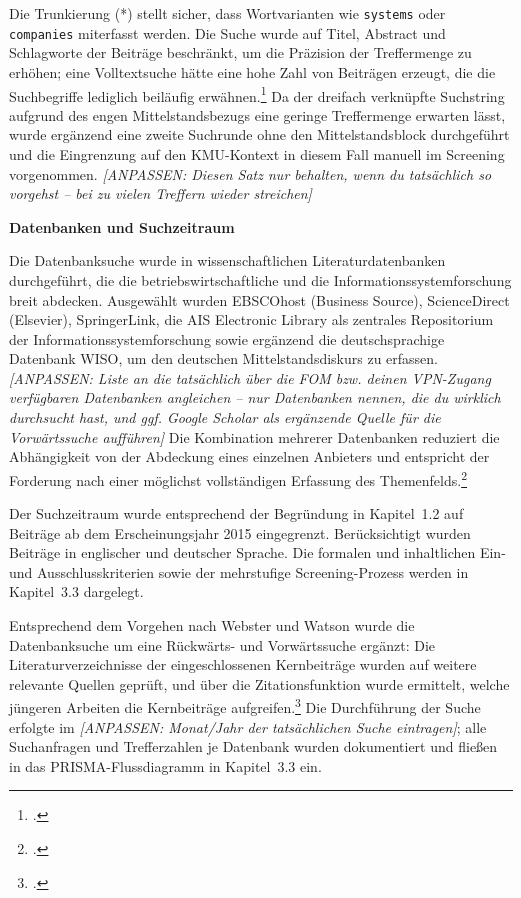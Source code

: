 Die Trunkierung (*) stellt sicher, dass Wortvarianten wie \texttt{systems} oder \texttt{companies} miterfasst werden. Die Suche wurde auf Titel, Abstract und Schlagworte der Beitr\"age beschr\"ankt, um die Pr\"azision der Treffermenge zu erh\"ohen; eine Volltextsuche h\"atte eine hohe Zahl von Beitr\"agen erzeugt, die die Suchbegriffe lediglich beil\"aufig erw\"ahnen.\footcite[Vgl.][S.~9--10]{vombrocke2009} Da der dreifach verkn\"upfte Suchstring aufgrund des engen Mittelstandsbezugs eine geringe Treffermenge erwarten l\"asst, wurde erg\"anzend eine zweite Suchrunde ohne den Mittelstandsblock durchgef\"uhrt und die Eingrenzung auf den KMU-Kontext in diesem Fall manuell im Screening vorgenommen. \textit{[ANPASSEN: Diesen Satz nur behalten, wenn du tats\"achlich so vorgehst -- bei zu vielen Treffern wieder streichen]}

\textbf{Datenbanken und Suchzeitraum}

Die Datenbanksuche wurde in wissenschaftlichen Literaturdatenbanken durchgef\"uhrt, die die betriebswirtschaftliche und die Informationssystemforschung breit abdecken. Ausgew\"ahlt wurden EBSCOhost (Business Source), ScienceDirect (Elsevier), SpringerLink, die AIS Electronic Library als zentrales Repositorium der Informationssystemforschung sowie erg\"anzend die deutschsprachige Datenbank WISO, um den deutschen Mittelstandsdiskurs zu erfassen. \textit{[ANPASSEN: Liste an die tats\"achlich \"uber die FOM bzw. deinen VPN-Zugang verf\"ugbaren Datenbanken angleichen -- nur Datenbanken nennen, die du wirklich durchsucht hast, und ggf. Google Scholar als erg\"anzende Quelle f\"ur die Vorw\"artssuche auff\"uhren]} Die Kombination mehrerer Datenbanken reduziert die Abh\"angigkeit von der Abdeckung eines einzelnen Anbieters und entspricht der Forderung nach einer m\"oglichst vollst\"andigen Erfassung des Themenfelds.\footcites[Vgl.][S.~xvi]{webster2002}[][S.~7--8]{vombrocke2009}

Der Suchzeitraum wurde entsprechend der Begr\"undung in Kapitel~1.2 auf Beitr\"age ab dem Erscheinungsjahr 2015 eingegrenzt. Ber\"ucksichtigt wurden Beitr\"age in englischer und deutscher Sprache. Die formalen und inhaltlichen Ein- und Ausschlusskriterien sowie der mehrstufige Screening-Prozess werden in Kapitel~3.3 dargelegt.

Entsprechend dem Vorgehen nach Webster und Watson wurde die Datenbanksuche um eine R\"uckw\"arts- und Vorw\"artssuche erg\"anzt: Die Literaturverzeichnisse der eingeschlossenen Kernbeitr\"age wurden auf weitere relevante Quellen gepr\"uft, und \"uber die Zitationsfunktion wurde ermittelt, welche j\"ungeren Arbeiten die Kernbeitr\"age aufgreifen.\footcite[Vgl.][S.~xvi]{webster2002} Die Durchf\"uhrung der Suche erfolgte im \textit{[ANPASSEN: Monat/Jahr der tats\"achlichen Suche eintragen]}; alle Suchanfragen und Trefferzahlen je Datenbank wurden dokumentiert und flie\ss{}en in das PRISMA-Flussdiagramm in Kapitel~3.3 ein.

